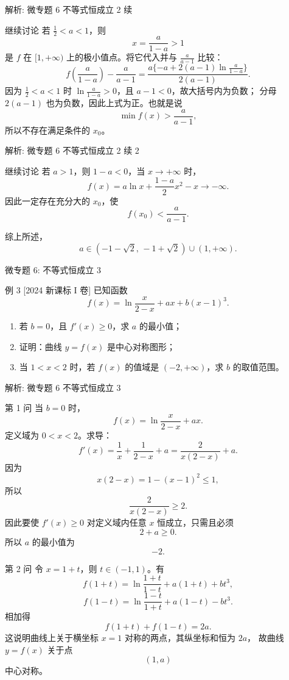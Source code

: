 ﻿\documentclass[aspectratio=169,10pt]{ctexbeamer}
\begin{document}
\begin{frame}[t,allowframebreaks]{解析: 微专题 6 不等式恒成立 2 续}
\tiny
\begin{block}{继续讨论}
若 $\frac12<a<1$，则
\[
x=\frac a{1-a}>1
\]
是 $f$ 在 $[1,+\infty)$ 上的极小值点。将它代入并与 $\frac a{a-1}$ 比较：
\[
f\left(\frac a{1-a}\right)-\frac a{a-1}
=\frac{a\{-a+2(a-1)\ln\frac a{1-a}\}}{2(a-1)}.
\]
因为 $\frac12<a<1$ 时 $\ln\frac a{1-a}>0$，且 $a-1<0$，故大括号内为负数；
分母 $2(a-1)$ 也为负数，因此上式为正。也就是说
\[
\min f(x)>\frac a{a-1},
\]
所以不存在满足条件的 $x_0$。
\end{block}
\end{frame}

\begin{frame}[t,allowframebreaks]{解析: 微专题 6 不等式恒成立 2 续 2}
\tiny
\begin{block}{继续讨论}
若 $a>1$，则 $1-a<0$，当 $x\to+\infty$ 时，
\[
f(x)=a\ln x+\frac{1-a}{2}x^2-x\to-\infty.
\]
因此一定存在充分大的 $x_0$，使
\[
f(x_0)<\frac a{a-1}.
\]

综上所述，
\[
a\in(-1-\sqrt2,\,-1+\sqrt2)\cup(1,+\infty).
\]
\end{block}
\end{frame}

\begin{frame}[t]{微专题 6: 不等式恒成立 3}
\large
\begin{block}{例 3}
[2024 新课标 I 卷] 已知函数
\[
f(x)=\ln\frac{x}{2-x}+ax+b(x-1)^3.
\]
\begin{enumerate}
  \item 若 $b=0$，且 $f'(x)\ge 0$，求 $a$ 的最小值；
  \item 证明：曲线 $y=f(x)$ 是中心对称图形；
  \item 当 $1<x<2$ 时，若 $f(x)$ 的值域是 $(-2,+\infty)$，求 $b$ 的取值范围。
\end{enumerate}
\end{block}
\end{frame}

\begin{frame}[t,allowframebreaks]{解析: 微专题 6 不等式恒成立 3}
\tiny
\begin{block}{第 1 问}
当 $b=0$ 时，
\[
f(x)=\ln\frac{x}{2-x}+ax.
\]
定义域为 $0<x<2$。求导：
\[
f'(x)=\frac1x+\frac1{2-x}+a=\frac2{x(2-x)}+a.
\]
因为
\[
x(2-x)=1-(x-1)^2\le1,
\]
所以
\[
\frac2{x(2-x)}\ge2.
\]
因此要使 $f'(x)\ge0$ 对定义域内任意 $x$ 恒成立，只需且必须
\[
2+a\ge0.
\]
所以 $a$ 的最小值为
\[
-2.
\]
\end{block}
\begin{block}{第 2 问}
令 $x=1+t$，则 $t\in(-1,1)$。有
\[
f(1+t)=\ln\frac{1+t}{1-t}+a(1+t)+bt^3,
\]
\[
f(1-t)=\ln\frac{1-t}{1+t}+a(1-t)-bt^3.
\]
相加得
\[
f(1+t)+f(1-t)=2a.
\]
这说明曲线上关于横坐标 $x=1$ 对称的两点，其纵坐标和恒为 $2a$，
故曲线 $y=f(x)$ 关于点
\[
(1,a)
\]
中心对称。
\end{block}
\end{frame}
\end{document}
